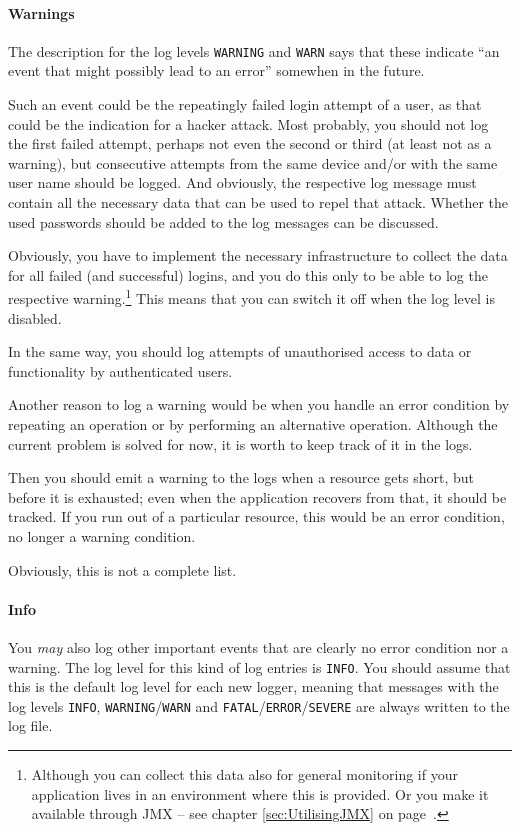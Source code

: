 \documentclass[11pt,a4paper, titlepage, parskip=half, headsepline, footsepline, cleardoublepage=current, headheight=1cm]{scrbook}
\newcommand*{\tqvref}[1]{\hyperref[{#1}]{\ref*{#1}} on page~\pageref{#1}}
\begin{document}
\paragraph{Warnings} The description for the log levels \verb#WARNING# and \verb#WARN# says that these indicate “an event that might possibly lead to an error” somewhen in the future.

Such an event could be the repeatingly failed login attempt of a user, as that could be the indication for a hacker attack. Most probably, you should not log the first failed attempt, perhaps not even the second or third (at least not as a warning), but consecutive attempts from the same device and/or with the same user name should be logged. And obviously, the respective log message must contain all the necessary data that can be used to repel that attack. Whether the used passwords should be added to the log messages can be discussed.

Obviously, you have to implement the necessary infrastructure to collect the data for all failed (and successful) logins, and you do this only to be able to log the respective warning.\footnote{Although you can collect this data also for general monitoring if your application lives in an environment where this is provided. Or you make it available through JMX – see chapter \tqvref{sec:UtilisingJMX}.} This means that you can switch it off when the log level is disabled.

In the same way, you should log attempts of unauthorised access to data or functionality by authenticated users.

Another reason to log a warning would be when you handle an error condition by repeating an operation or by performing an alternative operation. Although the current problem is solved for now, it is worth to keep track of it in the logs.

Then you should emit a warning to the logs when a resource gets short, but before it is exhausted; even when the application recovers from that, it should be tracked. If you run out of a particular resource, this would be an error condition, no longer a warning condition.

Obviously, this is not a complete list.

\paragraph{Info} You \textit{may} also log other important events that are clearly no error condition nor a warning. The log level for this kind of log entries is \verb#INFO#. You should assume that this is the default log level for each new logger, meaning that messages with the log levels \verb#INFO#, \verb#WARNING#/\verb#WARN# and \verb#FATAL#/\verb#ERROR#/\verb#SEVERE# are always written to the log file.
\end{document}
